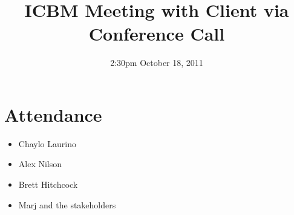 \documentclass{article}
\begin{document}
\title{ICBM Meeting with Client via Conference Call}
\date{2:30pm October 18, 2011}
\maketitle

\section{Attendance}
\begin{itemize}
\item Chaylo Laurino
\item Alex Nilson
\item Brett Hitchcock
\item Marj and the stakeholders
\end{itemize}
\end{document}
